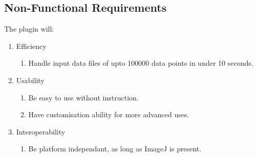 \subsection{Non-Functional Requirements}
\label{sub:non_functional_requirements}

The plugin will:

\begin{enumerate}
	\item Efficiency
		\begin{enumerate}
			\item Handle input data files of upto \num{100000} data points in
				under 10 seconds.
		\end{enumerate}
	\item Usability
		\begin{enumerate}
			\item Be easy to use without instruction.
			\item Have customisation ability for more advanced uses.
		\end{enumerate}
	\item Interoperability
		\begin{enumerate}
			\item Be platform independant, as long as ImageJ is present.
		\end{enumerate}
\end{enumerate}

\restoregeometry%

